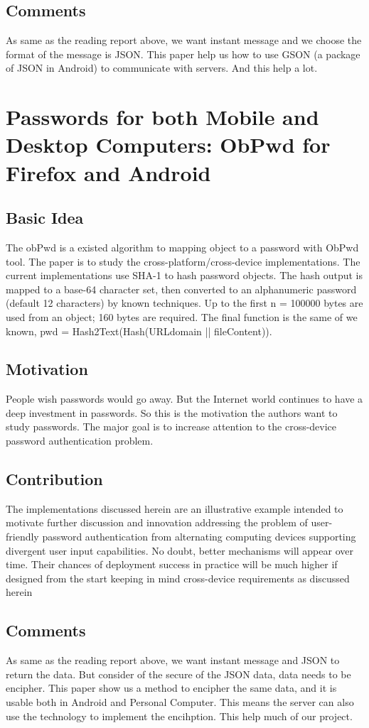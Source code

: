 \documentclass[a4paper]{article}
\begin{document}
    \subsection{Comments}
      As same as the reading report above, we want instant message and we choose the format of the message is JSON. This paper help us how to use GSON (a package of JSON in Android) to communicate with servers. And this help a lot.
      
  \section{Passwords for both Mobile and Desktop Computers: ObPwd for Firefox and Android}

    \subsection{Basic Idea}
      The obPwd is a existed algorithm to mapping object to a password with ObPwd tool.
      The paper is to study the cross-platform/cross-device implementations. The current implementations use SHA-1 to hash password objects. The hash output is mapped to a base-64 character set, then converted to an alphanumeric password (default 12 characters) by known techniques. Up to the first n = 100000 bytes are used from an object; 160 bytes are required. The final function is the same of we known, pwd = Hash2Text(Hash(URLdomain || fileContent)).

    \subsection{Motivation}
      People wish passwords would go away. But the Internet world continues to have a deep investment in passwords. So this is the motivation the authors want to study passwords. The major goal is to increase attention to the cross-device password authentication problem.
      
    \subsection{Contribution}
      The implementations discussed herein are an illustrative example intended to motivate further discussion and innovation addressing the problem of user-friendly password authentication from alternating computing devices supporting divergent user input capabilities. No doubt, better mechanisms will appear over time. Their chances of deployment success in practice will be much higher if designed from the start keeping in mind cross-device requirements as discussed herein

    \subsection{Comments}
      As same as the reading report above, we want instant message and JSON to return the data. But consider of the secure of the JSON data, data needs to be encipher. This paper show us a method to encipher the same data, and it is usable both in Android and Personal Computer. This means the server can also use the technology to implement the encihption. This help much of our project.
\end{document}
